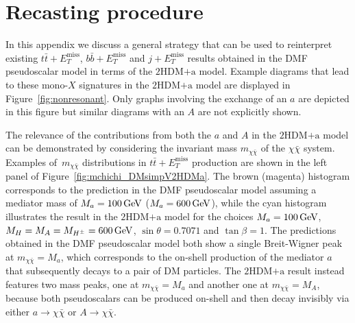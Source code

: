 \documentclass[a4paper, 11pt,notoc]{article}
\newcommand{\MET}{\ensuremath{E_T^\mathrm{miss}}\xspace}
\newcommand{\mA}{\ensuremath{M_{A}}\xspace}
\newcommand{\ma}{\ensuremath{M_{a}}\xspace}
\newcommand{\mH}{\ensuremath{M_{H}}\xspace}
\newcommand{\mHc}{\ensuremath{M_{H^{\pm}}}\xspace}
\newcommand{\hdma}{\ensuremath{\textrm{2HDM+a}}\xspace}
\begin{document}
\appendix

\section{Recasting procedure}
\label{app:recast}

In this appendix we discuss  a general strategy that can be used to reinterpret existing $t \bar t + \MET$, $b \bar b + \MET$ and $j + \MET$ results obtained in the DMF pseudoscalar model in terms of the \hdma model. Example diagrams that lead to these mono-$X$ signatures in the \hdma model are displayed in Figure~\ref{fig:nonresonant}. Only graphs involving the exchange of an $a$ are depicted in this figure but similar diagrams  with an  $A$ are not explicitly shown. 

 The relevance of the contributions from both the $a$ and $A$ in the \hdma model can be  demonstrated by considering the invariant mass $m_{\chi \bar \chi}$ of the $\chi \bar \chi$ system. Examples of~$m_{\chi \bar \chi}$ distributions in $t \bar t + \MET$ production are shown in the left panel of Figure~\ref{fig:mchichi_DMsimpV2HDMa}. The brown (magenta) histogram corresponds to the prediction in the DMF pseudoscalar model assuming a mediator mass of $\ma =100 \, {\rm  GeV}$ ($\ma =600 \, {\rm  GeV}$), while the cyan histogram illustrates the result in the \hdma model for the choices $\ma = 100 \, {\rm  GeV}$, $\mH = \mA = \mHc = 600 \, {\rm  GeV}$, $\sin\theta=0.7071$ and $\tan\beta=1$. The predictions obtained in the  DMF pseudoscalar model both show a single  Breit-Wigner  peak  at $m_{\chi \bar \chi} = \ma$, which corresponds to the on-shell production of the mediator $a$ that subsequently decays to a pair of DM particles. The \hdma result instead features two mass peaks, one at $m_{\chi \bar \chi} = \ma$ and another one at $m_{\chi \bar \chi} = \mA$, because both pseudoscalars can be produced on-shell and then decay invisibly via either $a \to \chi \bar \chi$ or $A \to \chi \bar \chi$.  
\end{document}
